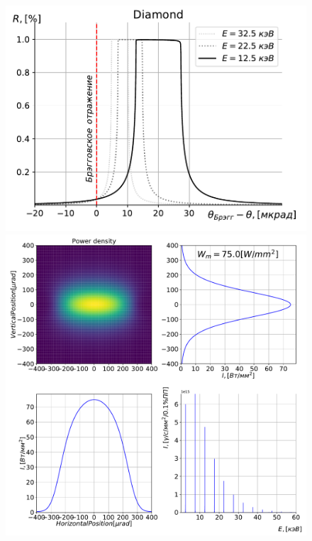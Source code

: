 \documentclass[14pt,a4paper]{extarticle}
\numberwithin{equation}{section}
\begin{document}
\begin{figure}[htbp]
	\centering  
	\begin{minipage}{0.49\textwidth}
		\centering
		\includegraphics[width=\textwidth]{pic/Diamond_bragg_R.pdf}
		\caption{}
		\label{fig:bragg_R}
	\end{minipage}\hfill
	
	\begin{minipage}{1.\textwidth}
		\centering  
		\includegraphics[width=\textwidth]{pic/power_dens.pdf}
		\caption{}
		\label{fig:spec}
\end{minipage}     
\end{figure}
\end{document}
